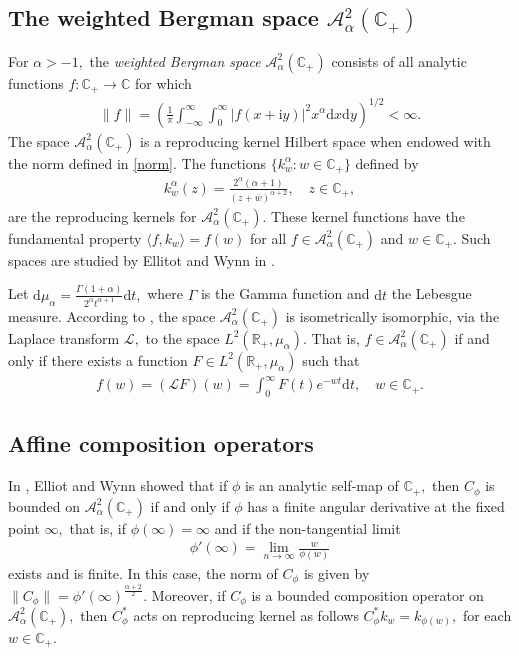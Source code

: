 \documentclass[11pt]{amsart}%
\numberwithin{equation}{section}
\theoremstyle{plain}
\theoremstyle{definition}
\theoremstyle{definition}
\newcommand{\hb}{\mathbb{C}_+}
\newcommand{\Ber}{\mathcal{A}^2_{\alpha}(\hb)}
\newcommand{\I}{\mathrm{i}}
\newcommand{\D}{\mathrm{d}}
\begin{document}
\subsection{The weighted Bergman space \texorpdfstring{$\Ber$}{}}
For $\alpha> -1,$ the \textit{weighted Bergman space} $\mathcal{A}^2_{\alpha}(\hb)$ consists of all analytic functions $f:\hb\rightarrow \mathbb{C}$ for which 
\begin{align}\label{norm}
\|f\|= \left(\frac{1}{\pi}\int_{-\infty}^{\infty}\int_{0}^{\infty} |f(x+\I y)|^2x^{\alpha}\D x \D y\right)^{1/2}<\infty .
\end{align}
The space $\mathcal{A}^2_{\alpha}(\hb)$ is a reproducing kernel Hilbert space when endowed with the norm defined in \eqref{norm}. The functions $\{k_w^{\alpha}:w\in \mathbb{C}_+\}$ defined by
\begin{align*}
k_{w}^{\alpha}(z)=\frac{2^{\alpha}(\alpha+1)}{(z+\overline{w})^{\alpha+2}}, \quad z\in \hb,
 \end{align*}
are the reproducing kernels for $\mathcal{A}^2_{\alpha}(\hb).$ These kernel functions have the fundamental property $\langle f, k_w\rangle=f(w)$ for all $f\in \Ber$ and $w\in \hb.$ Such spaces are studied by Ellitot and Wynn in \cite{Elliot}.


Let $\mathrm{d}\mu_{\alpha}=\frac{\Gamma(1+\alpha)}{2^{\alpha}t^{\alpha+1}}\mathrm{d}t,$ where $\Gamma$ is the Gamma function and $\mathrm{d}t$ the Lebesgue measure. According to \cite[Lem. 3.3]{Elliot}, the space $\mathcal{A}^2_{\alpha}(\hb)$ is isometrically isomorphic, via the Laplace
transform $\mathcal{L},$ to the space $L^2(\mathbb{R}_+, \mu_{\alpha}).$  That is, $f\in \Ber$ if and only if there exists a function $F\in L^2(\mathbb{R}_+, \mu_{\alpha})$ such that
\begin{align}\label{paley-wiener}
f(w)=(\mathcal{L}F)(w)=\int^{\infty}_0F(t)e^{-wt}\D t, \quad w\in \hb.
\end{align}

\subsection{Affine composition operators}
In \cite[Theorem 3.4]{Elliot}, Elliot and Wynn showed that if $\phi$ is an analytic self-map of $\hb,$ then $C_{\phi}$ is bounded on $\Ber$ if and only if $\phi$ has a finite angular derivative at the fixed point $\infty, $ that is, if $\phi(\infty)=\infty$ and if the non-tangential limit 
\begin{align}
\phi'(\infty)=\lim_{n\rightarrow \infty}\frac{w}{\phi(w)}
\end{align}
exists and is finite. In this case, the norm of $C_{\phi}$ is given by $\|C_{\phi}\|=\phi'(\infty)^{\frac{\alpha+2}{2}}.$ Moreover, if $C_{\phi}$ is a bounded composition operator on $\Ber,$ then $C_{\phi}^*$ acts on reproducing kernel as follows  $C_{\phi}^*k_w=k_{\phi(w)},$ for each $w\in \hb.$
\end{document}
